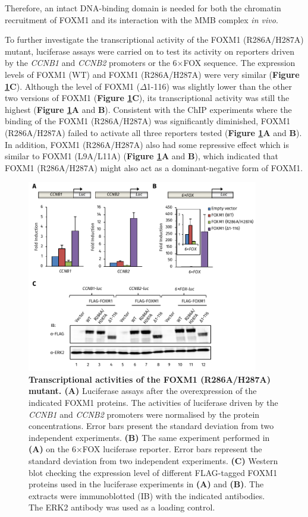 Therefore, an intact DNA-binding domain is needed for both the chromatin recruitment of FOXM1 and its interaction with the MMB complex \textit{in vivo}.

To further investigate the transcriptional activity of the FOXM1 (R286A/H287A) mutant, luciferase assays were carried on to test its activity on reporters driven by the \textit{CCNB1} and \textit{CCNB2} promoters or the 6$\times$FOX sequence. The expression levels of FOXM1 (WT) and FOXM1 (R286A/H287A) were very similar (\textbf{Figure \ref{fig:fig37}C}). Although the level of FOXM1 ($\Delta$1-116) was slightly lower than the other two versions of FOXM1 (\textbf{Figure \ref{fig:fig37}C}), its transcriptional activity was still the highest (\textbf{Figure \ref{fig:fig37}A} and \textbf{B}). Consistent with the ChIP experiments where the binding of the FOXM1 (R286A/H287A) was significantly diminished, FOXM1 (R286A/H287A) failed to activate all three reporters tested (\textbf{Figure \ref{fig:fig37}A} and \textbf{B}). In addition, FOXM1 (R286A/H287A) also had some repressive effect which is similar to FOXM1 (L9A/L11A) (\textbf{Figure \ref{fig:fig37}A} and \textbf{B}), which indicated that FOXM1 (R286A/H287A) might also act as a dominant-negative form of FOXM1.

\begin{figure}[!h]
    \centering
    \includegraphics[width=0.9\textwidth]{chapter3/figures_foxm1/fig37.pdf}
    \caption[Transcriptional activities of the FOXM1 (R286A/H287A) mutant]{\textbf{Transcriptional activities of the FOXM1 (R286A/H287A) mutant. (A)} Luciferase assays after the overexpression of the indicated FOXM1 proteins. The activities of luciferase driven by the \textit{CCNB1} and \textit{CCNB2} promoters were normalised by the protein concentrations. Error bars present the standard deviation from two independent experiments. \textbf{(B)} The same experiment performed in \textbf{(A)} on the 6$\times$FOX luciferase reporter. Error bars represent the standard deviation from two independent experiments. \textbf{(C)} Western blot checking the expression level of different FLAG-tagged FOXM1 proteins used in the luciferase experiments in \textbf{(A)} and \textbf{(B)}. The extracts were immunoblotted (IB) with the indicated antibodies. The ERK2 antibody was used as a loading control.}
    \label{fig:fig37}
\end{figure}

